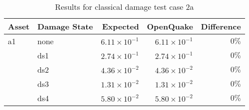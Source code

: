 \begin{table}[htbp]

\centering
\begin{tabular}{ l l r r r }

\hline
\rowcolor{anti-flashwhite}
\bf{Asset} & \bf{Damage State} & \bf{Expected} & \bf{OpenQuake} & \bf{Difference}\\
\hline
a1 & none & $6.11 \times 10^{-1}$ & $6.11 \times 10^{-1}$ & $0\%$ \\
   & ds1 & $2.74 \times 10^{-1}$ & $2.74 \times 10^{-1}$ & $0\%$ \\
   & ds2 & $4.36 \times 10^{-2}$ & $4.36 \times 10^{-2}$ & $0\%$ \\
   & ds3 & $1.31 \times 10^{-2}$ & $1.31 \times 10^{-2}$ & $0\%$ \\
   & ds4 & $5.80 \times 10^{-2}$ & $5.80 \times 10^{-2}$ & $0\%$ \\
\hline
\end{tabular}

\caption{Results for classical damage test case 2a}
\label{tab:result-cd-2a}
\end{table}
